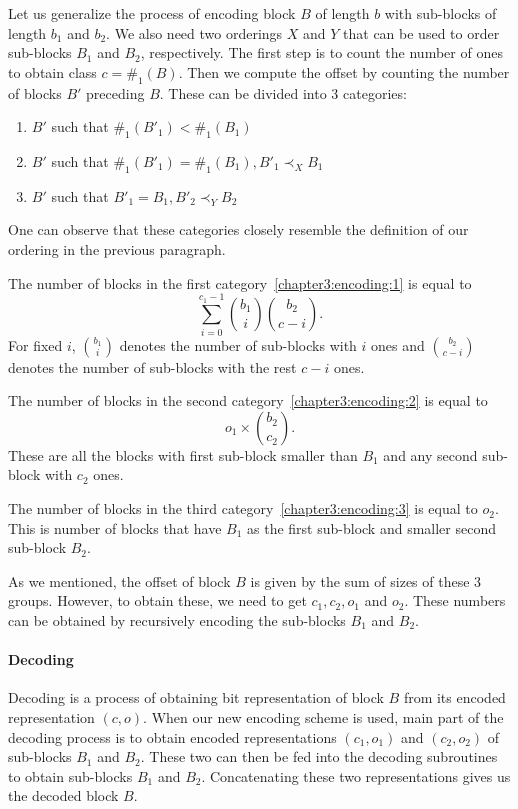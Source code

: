 Let us generalize the process of encoding block $B$ of length $b$
with sub-blocks of length $b_1$ and $b_2$. We also need two orderings $X$ and $Y$
that can be used to order sub-blocks $B_1$ and $B_2$, respectively.
The first step is to count the number of ones to obtain class $c=\#_1(B)$.
Then we compute the offset by counting the number of blocks $B'$ preceding $B$.
These can be divided into 3 categories:
\begin{enumerate}
    \item $B'$ such that $\#_1(B'_1) < \#_1(B_1)$
    \label{chapter3:encoding:1}
    \item $B'$ such that $\#_1(B'_1) = \#_1(B_1), B'_1\prec_X B_1$
    \label{chapter3:encoding:2}
    \item $B'$ such that $B'_1 = B_1, B'_2\prec_Y B_2$
    \label{chapter3:encoding:3}
\end{enumerate}
One can observe that these categories closely resemble the definition of our ordering
in the previous paragraph.

The number of blocks in the first category~\ref{chapter3:encoding:1} is equal to
$$\sum_{i=0}^{c_1-1} {b_1\choose i} {b_2\choose c-i}.$$ For fixed $i$, ${b_1\choose i}$
denotes the number of sub-blocks with $i$ ones and ${b_2\choose c-i}$ denotes the number
of sub-blocks with the rest $c-i$ ones.

The number of blocks in the second category~\ref{chapter3:encoding:2} is equal to
$$o_1\times {b_2\choose c_2}.$$ These are all the blocks with first sub-block smaller
than $B_1$ and any second sub-block with $c_2$ ones.

The number of blocks in the third category~\ref{chapter3:encoding:3} is equal to $o_2$.
This is number of blocks that have $B_1$ as the first sub-block and smaller second
sub-block $B_2$.

As we mentioned, the offset of block $B$ is given by the sum of sizes of these 3 groups.
However, to obtain these, we need to get $c_1, c_2, o_1$ and $o_2$. These numbers can be
obtained by recursively encoding the sub-blocks $B_1$ and $B_2$.

\paragraph{Decoding}

Decoding is a process of obtaining bit representation of block $B$ from its encoded
representation $(c, o)$. When our new encoding scheme is used, main part
of the decoding process is to obtain encoded representations $(c_1, o_1)$ and
$(c_2, o_2)$ of sub-blocks $B_1$ and $B_2$. These two can then be fed into
the decoding subroutines to obtain sub-blocks $B_1$ and $B_2$. Concatenating these
two representations gives us the decoded block $B$.

